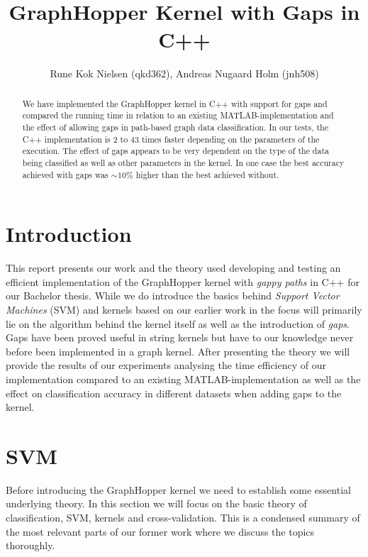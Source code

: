\documentclass{article}
\author{Rune Kok Nielsen (qkd362), Andreas Nugaard Holm (jnh508)}
\title{GraphHopper Kernel with Gaps in C++}
\begin{document}
	
\maketitle

\renewcommand\abstractname{\textit{Abstract}}
\begin{abstract}
	We have implemented the GraphHopper kernel in C++ with support for gaps and compared the running time in relation to an existing MATLAB-implementation and the effect of allowing gaps in path-based graph data classification. In our tests, the C++ implementation is 2 to 43 times faster depending on the parameters of the execution. The effect of gaps appears to be very dependent on the type of the data being classified as well as other parameters in the kernel. In one case the best accuracy achieved with gaps was $\sim 10\%$ higher than the best achieved without.
\end{abstract}

\newpage
\tableofcontents
\newpage

\section{Introduction}
This report presents our work and the theory used developing and testing an efficient implementation of the GraphHopper kernel\cite{gappy} with \textit{gappy paths} in C++ for our Bachelor thesis. While we do introduce the basics behind \textit{Support Vector Machines } (SVM) and kernels based on our earlier work in \cite{svm-graph-kernels} the focus will primarily lie on the algorithm behind the kernel itself as well as the introduction of \textit{gaps}. Gaps have been proved useful in string kernels\cite{string-kernels} but have to our knowledge never before been implemented in a graph kernel. After presenting the theory we will provide the results of our experiments analysing the time efficiency of our implementation compared to an existing MATLAB-implementation as well as the effect on classification accuracy in different datasets when adding gaps to the kernel.

\section{SVM}
Before introducing the GraphHopper kernel we need to establish some essential underlying theory. In this section we will focus on the basic theory of classification, SVM, kernels and cross-validation. This is a condensed summary of the most relevant parts of our former work \cite{svm-graph-kernels} where we discuss the topics thoroughly.
\end{document}
